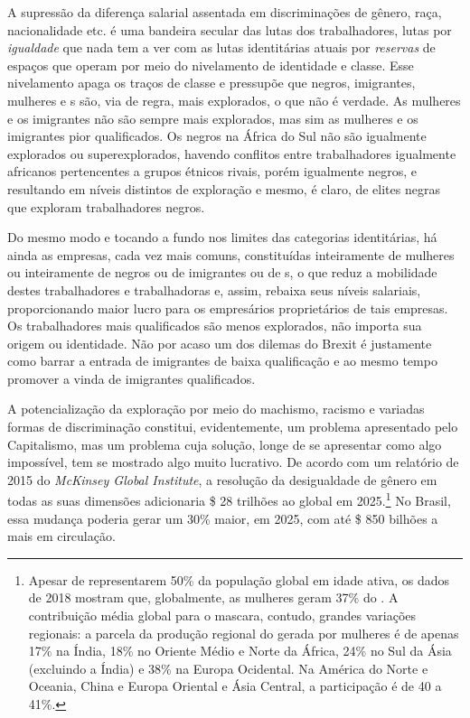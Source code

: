 A supressão da diferença salarial assentada em discriminações de gênero,
raça, nacionalidade etc. é uma bandeira secular das lutas dos
trabalhadores, lutas por \emph{igualdade} que nada tem a ver com as
lutas identitárias atuais por \emph{reservas} de espaços que operam por
meio do nivelamento de identidade e classe. Esse nivelamento apaga os
traços de classe e pressupõe que negros, imigrantes, mulheres e s
são, via de regra, mais explorados, o que não é verdade. As mulheres e
os imigrantes não são sempre mais explorados, mas sim as mulheres e os
imigrantes pior qualificados. Os negros na África do Sul não são
igualmente explorados ou superexplorados, havendo conflitos entre
trabalhadores igualmente africanos pertencentes a grupos étnicos rivais,
porém igualmente negros, e resultando em níveis distintos de exploração
e mesmo, é claro, de elites negras que exploram trabalhadores negros.

Do mesmo modo e tocando a fundo nos limites das categorias identitárias,
há ainda as empresas, cada vez mais comuns, constituídas inteiramente de
mulheres ou inteiramente de negros ou de imigrantes ou de s, o que
reduz a mobilidade destes trabalhadores e trabalhadoras e, assim,
rebaixa seus níveis salariais, proporcionando maior lucro para os
empresários proprietários de tais empresas. Os trabalhadores mais
qualificados são menos explorados, não importa sua origem ou identidade.
Não por acaso um dos dilemas do Brexit é justamente como barrar a
entrada de imigrantes de baixa qualificação e ao mesmo tempo promover a
vinda de imigrantes qualificados.

A potencialização da exploração por meio do machismo, racismo e variadas
formas de discriminação constitui, evidentemente, um problema
apresentado pelo Capitalismo, mas um problema cuja solução, longe de se
apresentar como algo impossível, tem se mostrado algo muito lucrativo.
De acordo com um relatório de 2015 do \emph{McKinsey Global Institute},
a resolução da desigualdade de gênero em todas as suas dimensões
adicionaria \$ 28 trilhões ao  global em 2025.\footnote{Apesar de
  representarem 50\% da população global em idade ativa, os dados de
  2018 mostram que, globalmente, as mulheres geram 37\% do . A
  contribuição média global para o  mascara, contudo, grandes
  variações regionais: a parcela da produção regional do  gerada por
  mulheres é de apenas 17\% na Índia, 18\% no Oriente Médio e Norte da
  África, 24\% no Sul da Ásia (excluindo a Índia) e 38\% na Europa
  Ocidental. Na América do Norte e Oceania, China e Europa Oriental e
  Ásia Central, a participação é de 40 a 41\%.} No Brasil, essa mudança
poderia gerar um  30\% maior, em 2025, com até \$ 850 bilhões a
mais em circulação.

